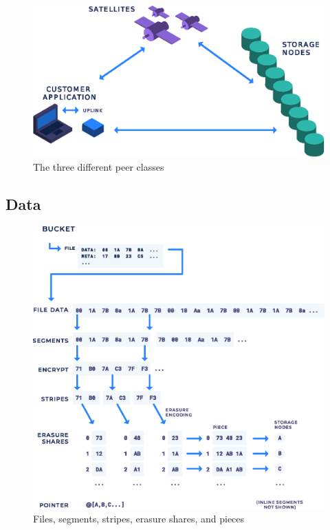 \documentclass[8pt,fleqn,openany]{book}
\begin{document}
\begin{figure}[!htbp]
\centering
\includegraphics[width=.75\textwidth]{images/overview.eps}
\caption{The three different peer classes}
\end{figure}

\subsection{Data}


\begin{figure}[!htbp]
\centering
\includegraphics[width=\textwidth]{images/structure.eps}
\caption{Files, segments, stripes, erasure shares, and pieces}
\end{figure}
\end{document}
